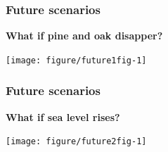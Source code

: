 \documentclass[color=usenames,dvipsnames]{beamer}\usepackage[]{graphicx}\usepackage[]{color}
\begin{document}



\begin{frame}[fragile]
  \frametitle{Future scenarios}
  {\bf What if pine and oak disapper? \par}
  \scriptsize


\texttt{[image: figure/future1fig-1]}
\end{frame}









\begin{frame}[fragile]
  \frametitle{Future scenarios}
  {\bf What if sea level rises? \par}
  \scriptsize
  \pause


\texttt{[image: figure/future2fig-1]}
\end{frame}



\end{document}
